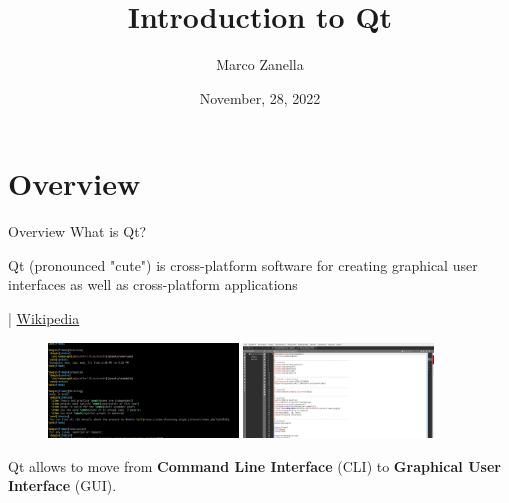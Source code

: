 \documentclass[11pt]{beamer}
\author{Marco Zanella}
\title{Introduction to Qt}
\institute{University of Padova}
\date{November, 28, 2022}
\renewcommand{\emph}[1]{\textbf{#1}}
\begin{document}
\begin{frame}
 \titlepage
\end{frame}

\begin{frame}
 \tableofcontents
\end{frame}


\section{Overview}
\begin{frame}{Overview}
 What is Qt?
 \begin{displayquote}
  Qt (pronounced "cute") is cross-platform software for creating graphical user interfaces as well as cross-platform applications
  \begin{flushright}
  | \href{https://en.wikipedia.org/wiki/Qt_(software)}{Wikipedia}
  \end{flushright}
 \end{displayquote}
 
 \begin{figure}
  \includegraphics[width=0.45\textwidth]{assets/figure-cli}
  \includegraphics[width=0.45\textwidth]{assets/figure-gui}
 \end{figure}
 Qt allows to move from \emph{Command Line Interface} (CLI) to \emph{Graphical User Interface} (GUI).
\end{frame}
\end{document}
